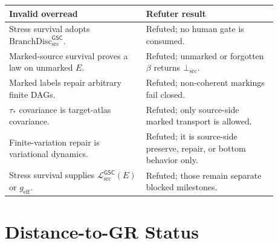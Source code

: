 \documentclass[11pt]{article}
\newcommand{\MetricData}{\mathcal{L}_{\mathrm{src}}^{\mathsf{GSC}}}
\newcommand{\BottomSrc}{\bot_{\mathrm{src}}}
\newcommand{\geff}{g_{\mathrm{eff}}}
\newcommand{\BranchDisc}{\mathrm{BranchDisc}_{\mathrm{src}}^{\mathsf{GSC}}}
\begin{document}
\begin{center}
\begin{tabular}{p{0.45\linewidth}p{0.43\linewidth}}
\toprule
Invalid overread & Refuter result \\
\midrule
Stress survival adopts \(\BranchDisc\). &
Refuted; no human gate is consumed. \\
Marked-source survival proves a law on unmarked \(E\). &
Refuted; unmarked or forgotten \(\beta\) returns \(\BottomSrc\). \\
Marked labels repair arbitrary finite DAGs. &
Refuted; non-coherent markings fail closed. \\
\(\tau_\ast\) covariance is target-atlas covariance. &
Refuted; only source-side marked transport is allowed. \\
Finite-variation repair is variational dynamics. &
Refuted; it is source-side preserve, repair, or bottom behavior only. \\
Stress survival supplies \(\MetricData(E)\) or \(\geff\). &
Refuted; those remain separate blocked milestones. \\
\bottomrule
\end{tabular}
\end{center}

\section{Distance-to-GR Status}
\end{document}
